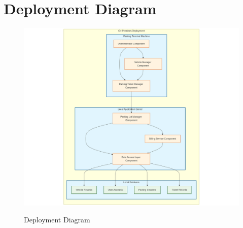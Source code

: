 \section{Deployment Diagram}

\begin{figure}[h!]
    \centering
    \includegraphics[width=\textwidth]{deployment-diagram/Deploy.png}
    \label{fig:user-story-mapping}
    \caption{Deployment Diagram}
\end{figure}
